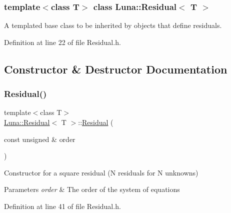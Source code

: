 \subsubsection*{template$<$class T$>$\newline
class Luna\+::\+Residual$<$ T $>$}

A templated base class to be inherited by objects that define residuals. 

Definition at line 22 of file Residual.\+h.



\subsection{Constructor \& Destructor Documentation}
\mbox{\label{classLuna_1_1Residual_a6d918065d5ad8f65e5d226b9903af0cd}} 
\subsubsection{\texorpdfstring{Residual()}{Residual()}\hspace{0.1cm}{\footnotesize\ttfamily [1/2]}}
{\footnotesize\ttfamily template$<$class T$>$ \\
\hyperlink{classLuna_1_1Residual}{Luna\+::\+Residual}$<$ T $>$\+::\hyperlink{classLuna_1_1Residual}{Residual} (\begin{DoxyParamCaption}\item[{const unsigned \&}]{order }\end{DoxyParamCaption})\hspace{0.3cm}{\ttfamily [inline]}}



Constructor for a \textquotesingle{}square\textquotesingle{} residual (N residuals for N unknowns) 


\begin{DoxyParams}{Parameters}
{\em order} & The order of the system of equations \\
\hline
\end{DoxyParams}


Definition at line 41 of file Residual.\+h.



